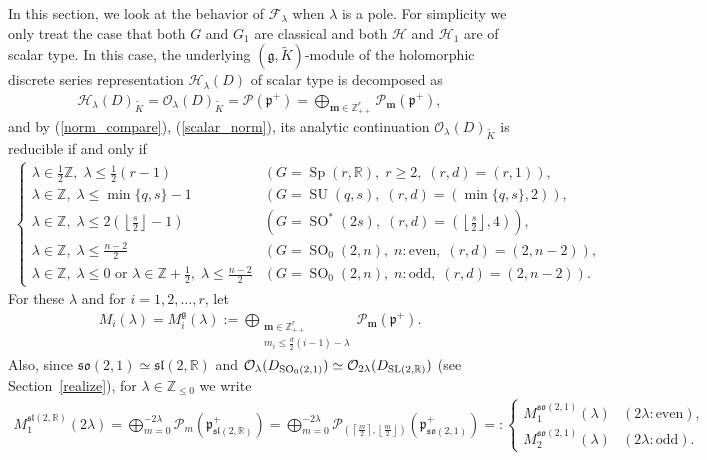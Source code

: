 \documentclass[pdftex]{sigma}
\numberwithin{equation}{section}
\newcommand{\bm}{\mathbf{m}}
\newcommand{\BZ}{\mathbb{Z}}
\newcommand{\BR}{\mathbb{R}}
\newcommand{\fg}{\mathfrak{g}}
\newcommand{\fp}{\mathfrak{p}}
\newcommand{\cF}{\mathcal{F}}
\newcommand{\cH}{\mathcal{H}}
\newcommand{\cO}{\mathcal{O}}
\newcommand{\cP}{\mathcal{P}}
\begin{document}
In this section, we look at the behavior of $\cF_\lambda$ when $\lambda$ is a pole.
For simplicity we only treat the case that both $G$ and $G_1$ are classical and both $\cH$ and $\cH_1$ are of scalar type.
In this case, the underlying $(\fg,\tilde{K})$-module of the holomorphic discrete series representation $\cH_\lambda(D)$ of scalar type
is decomposed as
\begin{gather*} \cH_\lambda(D)_{\tilde{K}}=\cO_\lambda(D)_{\tilde{K}}=\cP(\fp^+)=\bigoplus_{\bm\in\BZ_{++}^r}\cP_\bm(\fp^+), \end{gather*}
and by (\ref{norm_compare}), (\ref{scalar_norm}), its analytic continuation $\cO_\lambda(D)_{\tilde{K}}$ is reducible if and only if
\begin{gather*} \begin{cases} \lambda\in\frac{1}{2}\BZ,\; \lambda\le\frac{1}{2}(r-1) & (G=\operatorname{Sp}(r,\BR),\;r\ge 2,\;(r,d)=(r,1)),\\
\lambda\in\BZ,\; \lambda\le \min\{q,s\}-1 & (G=\operatorname{SU}(q,s),\;(r,d)=(\min\{q,s\},2)),\\
\lambda\in\BZ,\; \lambda\le 2\left(\left\lfloor\frac{s}{2}\right\rfloor-1\right)
& (G=\operatorname{SO}^*(2s),\;(r,d)=(\left\lfloor\frac{s}{2}\right\rfloor,4)),\\
\lambda\in\BZ,\; \lambda\le \frac{n-2}{2} & (G=\operatorname{SO}_0(2,n),\; n\colon \text{even},\; (r,d)=(2,n-2)),\\
\lambda\in\BZ,\; \lambda\le 0 \text{ or }\lambda\in\BZ+\frac{1}{2},\; \lambda\le \frac{n-2}{2} & (G=\operatorname{SO}_0(2,n),\; n\colon \text{odd},\; (r,d)=(2,n-2)).
\end{cases} \end{gather*}
For these $\lambda$ and for $i=1,2,\ldots,r$, let
\begin{gather*} M_i(\lambda)=M_i^\fg(\lambda):=\bigoplus_{\substack{\bm\in\BZ_{++}^{r}\\ m_i\le\frac{d}{2}(i-1)-\lambda}}\cP_\bm(\fp^+). \end{gather*}
Also, since $\mathfrak{so}(2,1)\simeq\mathfrak{sl}(2,\BR)$ and $\cO_{\lambda}(D_{\operatorname{SO}_0(2,1)})\simeq\cO_{2\lambda}(D_{{\rm SL}(2,\BR)})$
(see Section~\ref{realize}), for $\lambda\in\BZ_{\le 0}$ we write
\begin{gather*} M_1^{\mathfrak{sl}(2,\BR)}(2\lambda)=\bigoplus_{m=0}^{-2\lambda}\cP_m(\fp^+_{\mathfrak{sl}(2,\BR)})
=\bigoplus_{m=0}^{-2\lambda}\cP_{\left(\left\lceil\frac{m}{2}\right\rceil,\left\lfloor\frac{m}{2}\right\rfloor\right)}(\fp^+_{\mathfrak{so}(2,1)})
=:\begin{cases} M_1^{\mathfrak{so}(2,1)}(\lambda) & (2\lambda\colon \text{even}),\\ M_2^{\mathfrak{so}(2,1)}(\lambda) & (2\lambda\colon \text{odd}).
\end{cases} \end{gather*}
\end{document}
